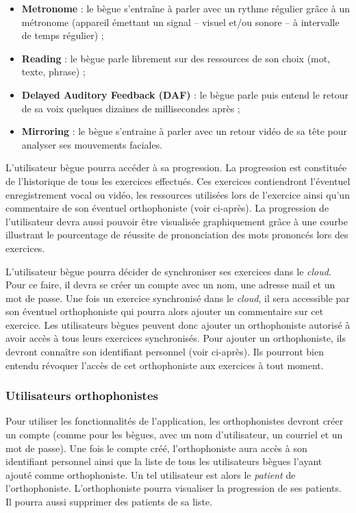 \begin{itemize}
  \item \textbf{Metronome} : le bègue s'entraîne à parler avec un rythme régulier grâce à un métronome (appareil émettant un signal -- visuel et/ou sonore -- à intervalle de temps régulier) ;
  \item \textbf{Reading} : le bègue parle librement sur des ressources de son choix (mot, texte, phrase) ;
  \item \textbf{Delayed Auditory Feedback (DAF)} : le bègue parle puis entend le retour de sa voix quelques dizaines de millisecondes après ;
  \item \textbf{Mirroring} : le bègue s'entraine à parler avec un retour vidéo de sa tête pour analyser ses mouvements faciales.
\end{itemize}

L'utilisateur bègue pourra accéder à sa progression. La progression est constituée de l'historique de tous les exercices effectués. Ces exercices contiendront l'éventuel enregistrement vocal ou vidéo, les ressources utilisées lors de l'exercice ainsi qu'un commentaire de son éventuel orthophoniste (voir ci-après). La progression de l'utilisateur devra aussi pouvoir être visualisée graphiquement grâce à une courbe illustrant le pourcentage de réussite de prononciation des mots prononcés lors des exercices.

L'utilisateur bègue pourra décider de synchroniser ses exercices dans le \textit{cloud}. Pour ce faire, il devra se créer un compte avec un nom, une adresse mail et un mot de passe. Une fois un exercice synchronisé dans le \textit{cloud}, il sera accessible par son éventuel orthophoniste qui pourra alors ajouter un commentaire sur cet exercice. Les utilisateurs bègues peuvent donc ajouter un orthophoniste autorisé à avoir accès à tous leurs exercices synchronisés. Pour ajouter un orthophoniste, ils devront connaître son identifiant personnel (voir ci-après). Ils pourront bien entendu révoquer l'accès de cet orthophoniste aux exercices à tout moment.

\subsubsection{Utilisateurs orthophonistes}

Pour utiliser les fonctionnalités de l'application, les orthophonistes devront créer un compte (comme pour les bègues, avec un nom d'utilisateur, un courriel et un mot de passe). Une fois le compte créé, l'orthophoniste aura accès à son identifiant personnel ainsi que la liste de tous les utilisateurs bègues l'ayant ajouté comme orthophoniste. Un tel utilisateur est alors le \textit{patient} de l'orthophoniste. L'orthophoniste pourra visualiser la progression de ses patients. Il pourra aussi supprimer des patients de sa liste.
















